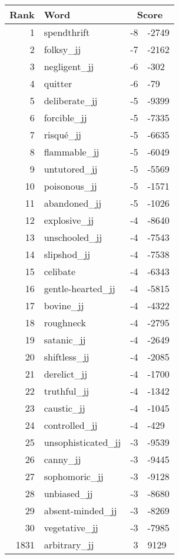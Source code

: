 \begin{longtable}[!htbp]{| rlr@{.}l |}
    \hline
    \textbf{Rank} & \textbf{Word} & \multicolumn{2}{c|}{\textbf{Score}} \\
    \hline
    \endhead
    1 & spendthrift & -8 & -2749 \\
    2 & folksy\_jj & -7 & -2162 \\
    3 & negligent\_jj & -6 & -302 \\
    4 & quitter & -6 & -79 \\
    5 & deliberate\_jj & -5 & -9399 \\
    6 & forcible\_jj & -5 & -7335 \\
    7 & risqué\_jj & -5 & -6635 \\
    8 & flammable\_jj & -5 & -6049 \\
    9 & untutored\_jj & -5 & -5569 \\
    10 & poisonous\_jj & -5 & -1571 \\
    11 & abandoned\_jj & -5 & -1026 \\
    12 & explosive\_jj & -4 & -8640 \\
    13 & unschooled\_jj & -4 & -7543 \\
    14 & slipshod\_jj & -4 & -7538 \\
    15 & celibate & -4 & -6343 \\
    16 & gentle-hearted\_jj & -4 & -5815 \\
    17 & bovine\_jj & -4 & -4322 \\
    18 & roughneck & -4 & -2795 \\
    19 & satanic\_jj & -4 & -2649 \\
    20 & shiftless\_jj & -4 & -2085 \\
    21 & derelict\_jj & -4 & -1700 \\
    22 & truthful\_jj & -4 & -1342 \\
    23 & caustic\_jj & -4 & -1045 \\
    24 & controlled\_jj & -4 & -429 \\
    25 & unsophisticated\_jj & -3 & -9539 \\
    26 & canny\_jj & -3 & -9445 \\
    27 & sophomoric\_jj & -3 & -9128 \\
    28 & unbiased\_jj & -3 & -8680 \\
    29 & absent-minded\_jj & -3 & -8269 \\
    30 & vegetative\_jj & -3 & -7985 \\
    1831 & arbitrary\_jj & 3 & 9129 \\

\end{longtable}
